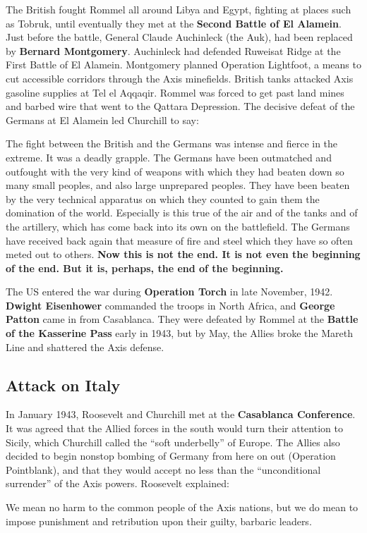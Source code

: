 The British fought Rommel all around Libya and Egypt, fighting at places such as Tobruk,
until eventually they met at the \textbf{Second Battle of El Alamein}.
Just before the battle, General Claude Auchinleck (the Auk), had been replaced by \textbf{Bernard Montgomery}.
Auchinleck had defended Ruweisat Ridge at the First Battle of El Alamein.
Montgomery planned Operation Lightfoot, a means to cut accessible corridors through the Axis minefields.
British tanks attacked Axis gasoline supplies at Tel el Aqqaqir.
Rommel was forced to get past land mines and barbed wire that went to the Qattara Depression.
The decisive defeat of the Germans at El Alamein led Churchill to say:
\begin{quoting}
  The fight between the British and the Germans was intense and fierce in the extreme.
  It was a deadly grapple.
  The Germans have been outmatched and outfought with the very kind of weapons
  with which they had beaten down so many small peoples, and also large unprepared peoples.
  They have been beaten by the very technical apparatus
  on which they counted to gain them the domination of the world.
  Especially is this true of the air and of the tanks and of the artillery,
  which has come back into its own on the battlefield.
  The Germans have received back again that measure of fire and steel which they have so often meted out to others.
  \textbf{%
    Now this is not the end.
    It is not even the beginning of the end.
    But it is, perhaps, the end of the beginning.
  }
\end{quoting}

The US entered the war during \textbf{Operation Torch} in late November, 1942.
\textbf{Dwight Eisenhower} commanded the troops in North Africa,
and \textbf{George Patton} came in from Casablanca.
They were defeated by Rommel at the \textbf{Battle of the Kasserine Pass} early in 1943,
but by May, the Allies broke the Mareth Line and shattered the Axis defense.

\subsection*{Attack on Italy}

In January 1943, Roosevelt and Churchill met at the \textbf{Casablanca Conference}.
It was agreed that the Allied forces in the south would turn their attention to Sicily,
which Churchill called the ``soft underbelly'' of Europe.
The Allies also decided to begin nonstop bombing of Germany from here on out (Operation Pointblank),
and that they would accept no less than the ``unconditional surrender'' of the Axis powers.
Roosevelt explained:
\begin{quoting}
  We mean no harm to the common people of the Axis nations,
  but we do mean to impose punishment and retribution upon their guilty, barbaric leaders.
\end{quoting}


